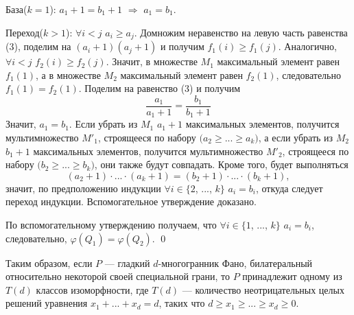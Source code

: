 \documentclass[12pt,notitlepage]{article}
\begin{document}
	База($k=1$): $a_1+1=b_1+1$ $\Rightarrow$ $a_1=b_1$.
	
	Переход($k>1$): $\forall i < j$ $a_i \geq a_j$. Домножим неравенство на левую часть равенства (3), поделим на $(a_i+1)(a_j+1)$ и получим $f_1(i) \geq f_1(j)$. Аналогично, $\forall i < j$ $f_2(i) \geq f_2(j)$. Значит, в множестве $M_1$ максимальный элемент равен $f_1(1)$, а в множестве $M_2$ максимальный элемент равен $f_2(1)$, следовательно $f_1(1) = f_2(1)$. Поделим на равенство (3) и получим
	\[
	\frac{a_1}{a_1+1}=\frac{b_1}{b_1+1}
	\]
	Значит, $a_1=b_1$. Если убрать из $M_1$ $a_1+1$ максимальных элементов, получится мультимножество $M'_1$, строящееся по набору $(a_2 \geq$...$\geq a_k)$, а если убрать из $M_2$ $b_1+1$ максимальных элементов, получится мультимножество $M'_2$, строящееся по набору $(b_2 \geq$...$\geq b_k)$, они также будут совпадать. Кроме того, будет выполняться
	\[
	(a_2+1)\cdot ... \cdot (a_k+1)=(b_2+1)\cdot ... \cdot (b_k+1),
	\]
	значит, по предположению индукции $\forall i \in \{2$, ..., $k\}$ $a_i=b_i$, откуда следует переход индукции. Вспомогательное утверждение доказано.
	
	По вспомогательному утверждению получаем, что $\forall i \in \{1$, ..., $k\}$ $a_i=b_i$, следовательно, $\varphi(Q_1)=\varphi(Q_2)$.
	\qed
	 
	Таким образом, если $P$ --- гладкий $d$-многогранник Фано, билатеральный относительно некоторой своей специальной грани, то $P$ принадлежит одному из $T(d)$ классов изоморфности, где $T(d)$ --- количество неотрицательных целых решений уравнения $x_1 + ... + x_d = d$, таких что $d \geq x_1 \geq ... \geq x_d \geq 0$.
\end{document}
